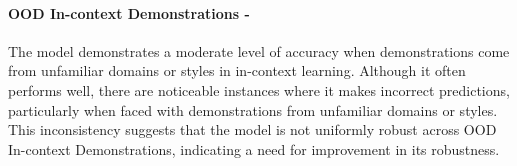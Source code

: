 \paragraph{OOD In-context Demonstrations - \moderate}
The model demonstrates a moderate level of accuracy when demonstrations come from unfamiliar domains or styles in in-context learning. Although it often performs well, there are noticeable instances where it makes incorrect predictions, particularly when faced with demonstrations from unfamiliar domains or styles. This inconsistency suggests that the model is not uniformly robust across OOD In-context Demonstrations, indicating a need for improvement in its robustness.